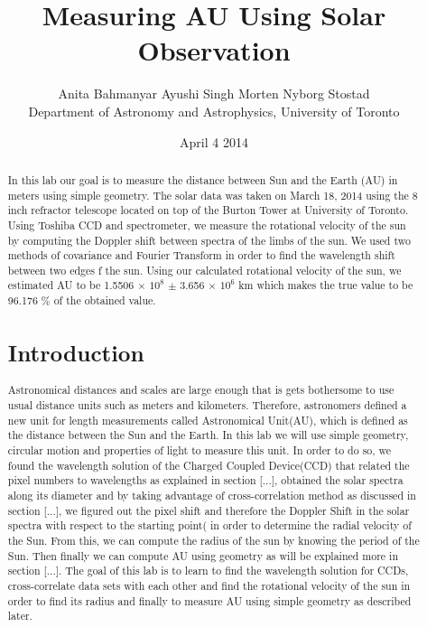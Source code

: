 \documentclass[letterpaper,12pt]{article}
\title{Measuring AU Using Solar Observation}
\author{Anita Bahmanyar \qquad Ayushi Singh \qquad Morten Nyborg Stostad \\Department of Astronomy and Astrophysics, University of Toronto}
\affil{\small {Written by: Anita Bahmanyar}}
\affil{\small {anita.bahmanyar@mail.utoronto.ca}}
\affil{\small {Student Number: 998909098}}
\date{April 4 2014}
\begin{document}
\maketitle

\begin{abstract}
\label{abstract}
In this lab our goal is to measure the distance between Sun and the Earth (AU) in meters using simple geometry. The solar data was taken on March 18, 2014 using the 8 inch refractor telescope located on top of the Burton Tower at University of Toronto. Using Toshiba CCD and spectrometer, we measure the rotational velocity of the sun by computing the Doppler shift between spectra of the limbs of the sun. We used two methods of covariance and Fourier Transform in order to find the wavelength shift between two edges f the sun. Using our calculated rotational velocity of the sun, we estimated AU to be 1.5506 $\times$ $10^{8}$ $\pm$ 3.656 $\times$ $10^6$ km which makes the true value to be 96.176 \% of the obtained value.

\section{Introduction}
\label{sec:introduction}
Astronomical distances and scales are large enough that is gets bothersome to use usual distance units such as meters and kilometers. Therefore, astronomers defined a new unit for length measurements called Astronomical Unit(AU), which is defined as the distance between the Sun and the Earth. In this lab we will use simple geometry, circular motion and properties of light to measure this unit. In order to do so, we found the wavelength solution of the Charged Coupled Device(CCD) that related the pixel numbers to wavelengths as explained in section [...], obtained the solar spectra along its diameter and by taking advantage of cross-correlation method as discussed in section [...], we figured out the pixel shift and therefore the Doppler Shift in the solar spectra with respect to the starting point( in order to determine the radial velocity of the Sun. From this, we can compute the radius of the sun by knowing the period of the Sun. Then finally we can compute AU using geometry as will be explained more in section [...]. The goal of this lab is to learn to find the wavelength solution for CCDs, cross-correlate data sets with each other and find the rotational velocity of the sun in order to find its radius and finally to measure AU using simple geometry as described later.



\end{abstract}
\end{document}
